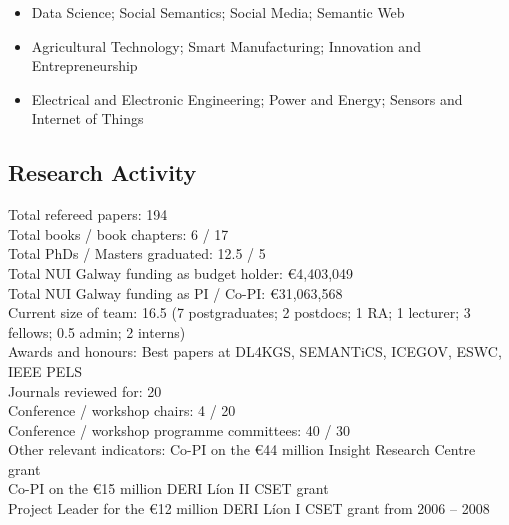 \documentclass[10pt,a4paper]{res} %
\begin{document}
\begin{resume}
\begin{itemize} \itemsep -2pt
\item Data Science; Social Semantics; Social Media; Semantic Web
\item Agricultural Technology; Smart Manufacturing; Innovation and Entrepreneurship
\item Electrical and Electronic Engineering; Power and Energy; Sensors and Internet of Things
\end{itemize}

\subsection*{Research Activity}

\begin{center}
Total refereed papers: \hfill 194 \\
Total books / book chapters: \hfill 6 / 17 \\
Total PhDs / Masters graduated: \hfill 12.5 / 5 \\
Total NUI Galway funding as budget holder: \hfill \euro{}4,403,049 \\
Total NUI Galway funding as PI / Co-PI: \hfill \euro{}31,063,568 \\
Current size of team: \hfill 16.5 (7 postgraduates; 2 postdocs; 1 RA; 1 lecturer; 3 fellows; 0.5 admin; 2 interns) \\
Awards and honours: \hfill Best papers at DL4KGS, SEMANTiCS, ICEGOV, ESWC, IEEE PELS \\
Journals reviewed for: \hfill 20 \\
Conference / workshop chairs: \hfill 4 / 20 \\
Conference / workshop programme committees: \hfill 40 / 30 \\
Other relevant indicators: \hfill Co-PI on the \euro{}44 million Insight Research Centre grant \\ \hfill Co-PI on the \euro{}15 million DERI L\'{i}on II CSET grant \\ \hfill Project Leader for the \euro{}12 million DERI L\'{i}on I CSET grant from 2006 -- 2008
\end{center}


\vspace{0.2in} %



\end{resume}
\end{document}
